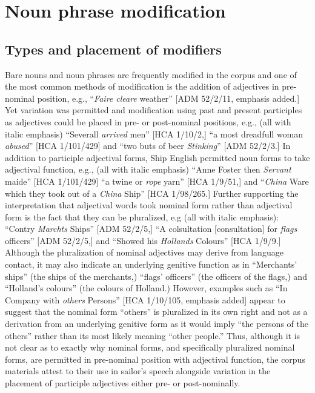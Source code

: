 \section{{Noun} {phrase} {modification} }%

\subsection{{Types} {and} {placement} {of} {modifiers}}%

  Bare nouns and noun phrases are frequently modified in the corpus and one of the most common methods of modification is the addition of adjectives in pre-nominal position, e.g., “\textit{Faire cleare} weather” [ADM 52/2/11, emphasis added.] Yet variation was permitted and modification using past and present participles as adjectives could be placed in pre- or post-nominal positions, e.g., (all with italic emphasis) “Severall \textit{arrived} men” [HCA 1/10/2,] “a most dreadfull woman \textit{abused}” [HCA 1/101/429] and “two buts of beer \textit{Stinking}” [ADM 52/2/3.]  In addition to participle adjectival forms, Ship English permitted noun forms to take adjectival function, e.g., (all with italic emphasis) “Anne Foster then \textit{Servant} maide” [HCA 1/101/429] “a twine or \textit{rope} yarn” [HCA 1/9/51,] and “\textit{China} Ware which they took out of a \textit{China} Ship” [HCA 1/98/265.] Further supporting the interpretation that adjectival words took nominal form rather than adjectival form is the fact that they can be pluralized, e.g (all with italic emphasis): “Contry \textit{Marchts} Ships” [ADM 52/2/5,] “A colsultation [consultation] for \textit{flags} officers” [ADM 52/2/5,] and “Showed his \textit{Hollands} Colours” [HCA 1/9/9.] Although the pluralization of nominal adjectives may derive from language contact, it may also indicate an underlying genitive function as in “Merchants’ ships” (the ships of the merchants,) “flags’ officers” (the officers of the flags,) and “Holland’s colours” (the colours of Holland.) However, examples such as “In Company with \textit{others} Persons” [HCA 1/10/105, emphasis added] appear to suggest that the nominal form “others” is pluralized in its own right and not as a derivation from an underlying genitive form as it would imply “the persons of the others” rather than its most likely meaning “other people.” Thus, although it is not clear as to exactly why nominal forms, and specifically pluralized nominal forms, are permitted in pre-nominal position with adjectival function, the corpus materials attest to their use in sailor’s speech alongside variation in the placement of participle adjectives either pre- or post-nominally. 

